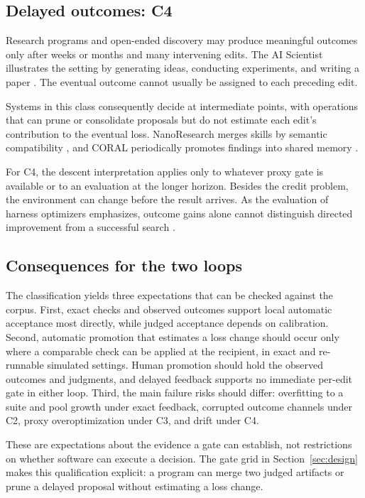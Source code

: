 \subsection{Delayed outcomes: C4}\label{delayed-outcomes-c4}

Research programs and open-ended discovery may produce meaningful outcomes only after weeks or months and many intervening edits. The AI Scientist illustrates the setting by generating ideas, conducting experiments, and writing a paper \cite{lu2024aiscientist}. The eventual outcome cannot usually be assigned to each preceding edit.

Systems in this class consequently decide at intermediate points, with operations that can prune or consolidate proposals but do not estimate each edit's contribution to the eventual loss. NanoResearch merges skills by semantic compatibility \cite{xu2026nanoresearch}, and CORAL periodically promotes findings into shared memory \cite{qu2026coral}.

For C4, the descent interpretation applies only to whatever proxy gate is available or to an evaluation at the longer horizon. Besides the credit problem, the environment can change before the result arrives. As the evaluation of harness optimizers emphasizes, outcome gains alone cannot distinguish directed improvement from a successful search \cite{ong2026harnesseval}.

\subsection{Consequences for the two loops}\label{consequences-for-the-two-loops}

The classification yields three expectations that can be checked against the corpus. First, exact checks and observed outcomes support local automatic acceptance most directly, while judged acceptance depends on calibration. Second, automatic promotion that estimates a loss change should occur only where a comparable check can be applied at the recipient, in exact and re-runnable simulated settings. Human promotion should hold the observed outcomes and judgments, and delayed feedback supports no immediate per-edit gate in either loop. Third, the main failure risks should differ: overfitting to a suite and pool growth under exact feedback, corrupted outcome channels under C2, proxy overoptimization under C3, and drift under C4.

These are expectations about the evidence a gate can establish, not restrictions on whether software can execute a decision. The gate grid in Section~\ref{sec:design} makes this qualification explicit: a program can merge two judged artifacts or prune a delayed proposal without estimating a loss change.

